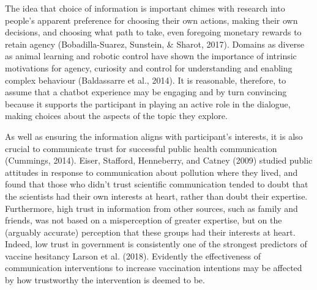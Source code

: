 \documentclass[
  english,
  ,jou,floatsintext]{apa6}
\begin{document}
The idea that choice of information is important chimes with research into people's apparent preference for choosing their own actions, making their own decisions, and choosing what path to take, even foregoing monetary rewards to retain agency (Bobadilla-Suarez, Sunstein, \& Sharot, 2017). Domains as diverse as animal learning and robotic control have shown the importance of intrinsic motivations for agency, curiosity and control for understanding and enabling complex behaviour (Baldassarre et al., 2014). It is reasonable, therefore, to assume that a chatbot experience may be engaging and by turn convincing because it supports the participant in playing an active role in the dialogue, making choices about the aspects of the topic they explore.

As well as ensuring the information aligns with participant's interests, it is also crucial to communicate trust for successful public health communication (Cummings, 2014). Eiser, Stafford, Henneberry, and Catney (2009) studied public attitudes in response to communication about pollution where they lived, and found that those who didn't trust scientific communication tended to doubt that the scientists had their own interests at heart, rather than doubt their expertise. Furthermore, high trust in information from other sources, such as family and friends, was not based on a misperception of greater expertise, but on the (arguably accurate) perception that these groups had their interests at heart. Indeed, low trust in government is consistently one of the strongest predictors of vaccine hesitancy Larson et al. (2018). Evidently the effectiveness of communication interventions to increase vaccination intentions may be affected by how trustworthy the intervention is deemed to be.
\end{document}
